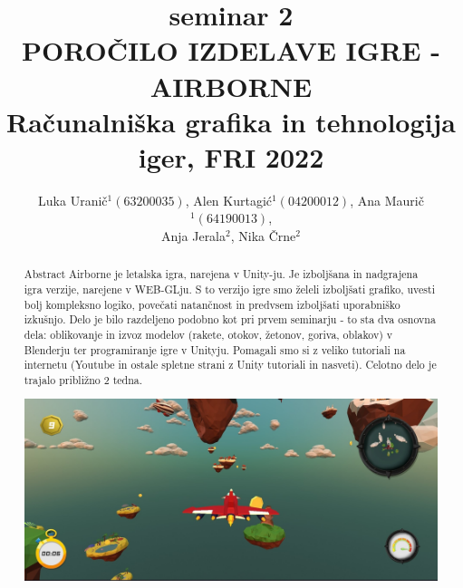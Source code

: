 \documentclass[a4paper]{article}
\begin{document}
\title{seminar 2\\ POROČILO IZDELAVE IGRE - AIRBORNE \\
 Računalniška grafika in tehnologija iger, FRI 2022}

\author{Luka Uranič$^{1} (63200035)$, Alen Kurtagić$^{1} (04200012)$,  Ana Maurič$^{1} (64190013)$, \\ Anja Jerala$^{2}$,  Nika Črne$^{2}$} %


\maketitle


\begin{abstract}{Abstract}
Airborne je letalska igra, narejena v Unity-ju. Je izboljšana in nadgrajena igra verzije, narejene v WEB-GLju. S to verzijo igre smo želeli izboljšati grafiko, uvesti bolj kompleksno logiko, povečati natančnost in predvsem izboljšati uporabniško izkušnjo. Delo je bilo razdeljeno podobno kot pri prvem seminarju - to sta dva osnovna dela: oblikovanje in izvoz modelov (rakete, otokov, žetonov, goriva, oblakov) v Blenderju ter programiranje igre v Unityju. Pomagali smo si z veliko tutoriali na internetu (Youtube in ostale spletne strani z Unity tutoriali in nasveti). Celotno delo je trajalo približno 2 tedna. 
\begin{center}
     \includegraphics[width=\columnwidth]{game.jpg}
\end{center}
\end{abstract}
\end{document}
